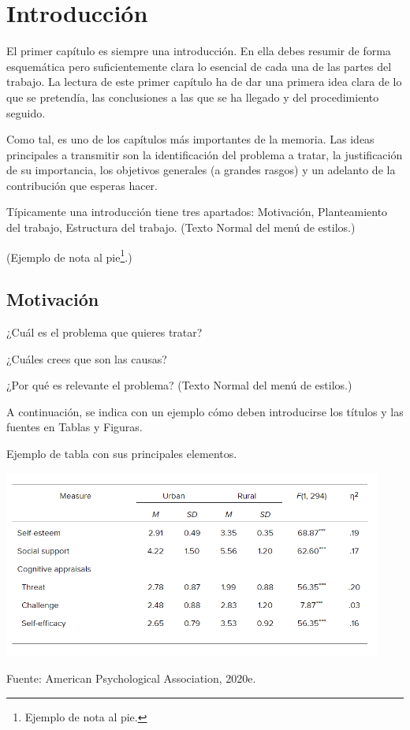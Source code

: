 \section{Introducción}

El primer capítulo es siempre una introducción. En ella debes resumir de forma esquemática pero suficientemente clara lo esencial de cada una de las partes del trabajo. La lectura de este primer capítulo ha de dar una primera idea clara de lo que se pretendía, las conclusiones a las que se ha llegado y del procedimiento seguido.

Como tal, es uno de los capítulos más importantes de la memoria. Las ideas principales a transmitir son la identificación del problema a tratar, la justificación de su importancia, los objetivos generales (a grandes rasgos) y un adelanto de la contribución que esperas hacer.

Típicamente una introducción tiene tres apartados: Motivación, Planteamiento del trabajo, Estructura del trabajo. (Texto Normal del menú de estilos.)

(Ejemplo de nota al pie\footnote{Ejemplo de nota al pie.}.)

\subsection{Motivación}

¿Cuál es el problema que quieres tratar?

¿Cuáles crees que son las causas?

¿Por qué es relevante el problema? (Texto Normal del menú de estilos.)

A continuación, se indica con un ejemplo cómo deben introducirse los títulos y las fuentes en Tablas y Figuras.

\begin{table}[t]
	\begin{center}
	\caption{Ejemplo de tabla con sus principales elementos.}
	\label{tab:1}
	\includegraphics[width=4.90737in,height=2.42708in]{tabla}

	\small Fuente: American Psychological Association, 2020e.
	\end{center}
\end{table}


